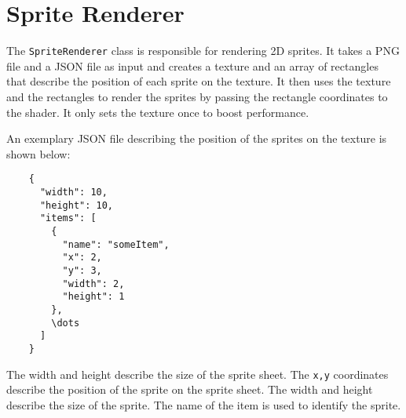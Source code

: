 \section{Sprite Renderer}\label{sprite_renderer}
The \texttt{SpriteRenderer} class is responsible for rendering 2D sprites.
It takes a PNG file and a JSON file as input and creates a texture and an array of rectangles that describe the position of each sprite on the texture.
It then uses the texture and the rectangles to render the sprites by passing the rectangle coordinates to the shader.
It only sets the texture once to boost performance.

An exemplary JSON file describing the position of the sprites on the texture is shown below:

\begin{verbatim}
    {
      "width": 10,
      "height": 10,
      "items": [
        {
          "name": "someItem",
          "x": 2,
          "y": 3,
          "width": 2,
          "height": 1
        },
        \dots
      ]
    }
\end{verbatim}


The width and height describe the size of the sprite sheet.
The \texttt{x,y} coordinates describe the position of the sprite on the sprite sheet.
The width and height describe the size of the sprite.
The name of the item is used to identify the sprite.